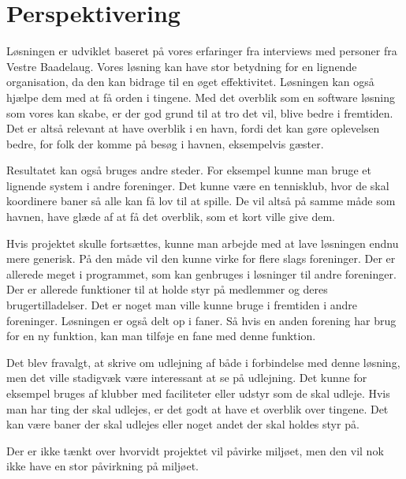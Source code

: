 \chapter{Perspektivering}
\label{cha:perspektivering}


Løsningen er udviklet baseret på vores erfaringer fra interviews med personer fra Vestre Baadelaug. Vores løsning kan have stor betydning for en lignende organisation, da den kan bidrage til en øget effektivitet. Løsningen kan også hjælpe dem med at få orden i tingene. Med det overblik som en software løsning som vores kan skabe, er der god grund til at tro det vil, blive bedre i fremtiden. Det er altså relevant at have overblik i en havn, fordi det kan gøre oplevelsen bedre, for folk der komme på besøg i havnen, eksempelvis gæster.

Resultatet kan også bruges andre steder. For eksempel kunne man bruge et lignende system i andre foreninger. Det kunne være en tennisklub, hvor de skal koordinere baner så alle kan få lov til at spille. De vil altså på samme måde som havnen, have glæde af at få det overblik, som et kort ville give dem.

Hvis projektet skulle fortsættes, kunne man arbejde med at lave løsningen endnu mere generisk. På den måde vil den kunne virke for flere slags foreninger. Der er allerede meget i programmet, som kan genbruges i løsninger til andre foreninger. Der er allerede funktioner til at holde styr på medlemmer og deres brugertilladelser. Det er noget man ville kunne bruge i fremtiden i andre foreninger. Løsningen er også delt op i faner. Så hvis en anden forening har brug for en ny funktion, kan man tilføje en fane med denne funktion.

Det blev fravalgt, at skrive om udlejning af både i forbindelse med denne løsning, men det ville stadigvæk være interessant at se på udlejning. Det kunne for eksempel bruges af klubber med faciliteter eller udstyr som de skal udleje. Hvis man har ting der skal udlejes, er det godt at have et overblik over tingene. Det kan være baner der skal udlejes eller noget andet der skal holdes styr på.

Der er ikke tænkt over hvorvidt projektet vil påvirke miljøet, men den vil nok ikke have en stor påvirkning på miljøet.


